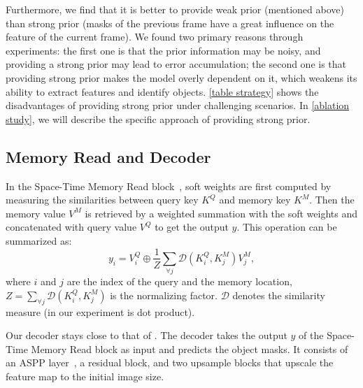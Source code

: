 \documentclass[runningheads]{llncs}
\begin{document}
Furthermore, we find that it is better to provide weak prior (mentioned above) than strong prior (masks of the previous frame have a great influence on the feature of the current frame).
    We found two primary reasons through experiments: the first one is that the prior information may be noisy, and providing a strong prior may lead to error accumulation; 
    the second one is that providing strong prior makes the model overly dependent on it, which weakens its ability to extract features and identify objects. 
    \cref{table strategy} shows the disadvantages of providing strong prior under challenging scenarios. 
    In \cref{ablation study}, we will describe the specific approach of providing strong prior.

\subsection{Memory Read and Decoder}


    In the Space-Time Memory Read block~\cite{stm}, soft weights are first computed by measuring the similarities between query key $K^Q$ and memory key $K^M$. Then the memory value $V^M$ is retrieved by a weighted summation with the soft weights and concatenated with query value $V^Q$ to get the output $y$. This operation can be summarized as:
    \begin{equation}
        y_i = V^Q_i \oplus \frac{1}{Z}\sum_{\forall j}{\mathcal{D}(K^Q_i,K^M_j)V^M_j},
    \end{equation}
    where $i$ and $j$ are the index of the query and the memory location, $Z = \sum_{\forall j}\mathcal{D}({K}^Q_i,{K}^M_j)$ is the normalizing factor. $\mathcal{D}$ denotes the similarity measure (in our experiment is dot product).
    
    Our decoder stays close to that of \cite{decoder,stm}. The decoder takes the output $y$ of the Space-Time Memory Read block as input and predicts the object masks. It consists of an ASPP layer~\cite{aspp}, a residual block, and two upsample blocks that upscale the feature map to the initial image size. 
\end{document}
